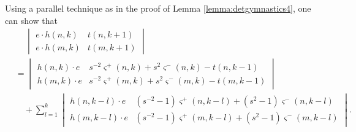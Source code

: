 \begin{remark} \label{rmk:detgymnastics6}
Using a parallel technique as in the proof of Lemma \ref{lemma:detgymnastics4}, one can show that
\begin{align*}
& \quad \,
\begin{vmatrix}
e \cdot h(n, k) & t(n, k+1) \\
e \cdot h(m, k) & t(m, k+1)
\end{vmatrix} \\
&=
\begin{vmatrix}
h(n, k) \cdot e & s^{-2} \varsigma^+ (n, k) + s^{2} \varsigma^- (n, k) - t(n, k-1) \\
h(m, k) \cdot e & s^{-2} \varsigma^+ (m, k) + s^{2} \varsigma^- (m, k) - t(m, k-1)
\end{vmatrix}\\
& \quad +
\sum_{l=1}^{k}
\begin{vmatrix}
h(n, k-l) \cdot e & (s^{-2} - 1) \varsigma^+ (n, k-l) + (s^{2} - 1) \varsigma^- (n, k-l) \\
h(m, k-l) \cdot e & (s^{-2} - 1) \varsigma^+ (m, k-l) + (s^{2} - 1) \varsigma^- (m, k-l)
\end{vmatrix}.
\end{align*}
\end{remark}


